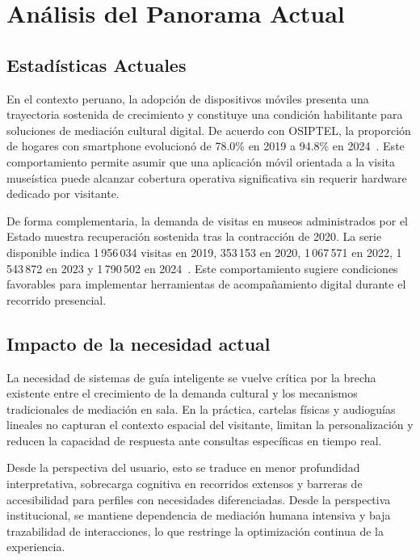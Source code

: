 \chapter{Análisis del Panorama Actual}

\section{Estadísticas Actuales}

En el contexto peruano, la adopción de dispositivos móviles presenta una trayectoria sostenida de crecimiento y constituye una condición habilitante para soluciones de mediación cultural digital. De acuerdo con OSIPTEL, la proporción de hogares con smartphone evolucionó de 78.0\% en 2019 a 94.8\% en 2024~\cite{osiptel2021smartphone,osiptel2022smartphone,osiptel2023smartphone,osiptel2024smartphone}. Este comportamiento permite asumir que una aplicación móvil orientada a la visita museística puede alcanzar cobertura operativa significativa sin requerir hardware dedicado por visitante.


De forma complementaria, la demanda de visitas en museos administrados por el Estado muestra recuperación sostenida tras la contracción de 2020. La serie disponible indica 1\,956\,034 visitas en 2019, 353\,153 en 2020, 1\,067\,571 en 2022, 1\,543\,872 en 2023 y 1\,790\,502 en 2024~\cite{culturapesem2021,cultura2020memoria,cultura2022memoria,cultura2023memoria,cultura2024reporte}. Este comportamiento sugiere condiciones favorables para implementar herramientas de acompañamiento digital durante el recorrido presencial.


\section{Impacto de la necesidad actual}

La necesidad de sistemas de guía inteligente se vuelve crítica por la brecha existente entre el crecimiento de la demanda cultural y los mecanismos tradicionales de mediación en sala. En la práctica, cartelas físicas y audioguías lineales no capturan el contexto espacial del visitante, limitan la personalización y reducen la capacidad de respuesta ante consultas específicas en tiempo real.

Desde la perspectiva del usuario, esto se traduce en menor profundidad interpretativa, sobrecarga cognitiva en recorridos extensos y barreras de accesibilidad para perfiles con necesidades diferenciadas. Desde la perspectiva institucional, se mantiene dependencia de mediación humana intensiva y baja trazabilidad de interacciones, lo que restringe la optimización continua de la experiencia.

